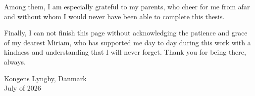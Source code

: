 Among them, I am especially grateful to my parents, who cheer for me from afar and without whom I would never have been able to complete this thesis.

Finally, I can not finish this page without acknowledging the patience and grace of my dearest Miriam, who has supported me day to day during this work with a kindness and understanding that I will never forget. Thank you for being there, always.

\vspace{1cm}
\begin{flushright}
Kongens Lyngby, Danmark\\
July of 2026
\end{flushright}

\cleartoverso %
